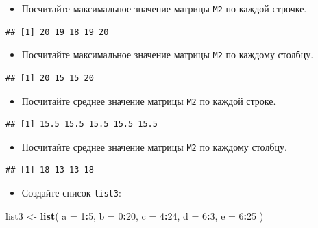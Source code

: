 \documentclass[]{book}
\newenvironment{Shaded}{\begin{snugshade}}{\end{snugshade}}
\newcommand{\KeywordTok}[1]{\textcolor[rgb]{0.13,0.29,0.53}{\textbf{#1}}}
\newcommand{\DataTypeTok}[1]{\textcolor[rgb]{0.13,0.29,0.53}{#1}}
\newcommand{\DecValTok}[1]{\textcolor[rgb]{0.00,0.00,0.81}{#1}}
\newcommand{\StringTok}[1]{\textcolor[rgb]{0.31,0.60,0.02}{#1}}
\newcommand{\OperatorTok}[1]{\textcolor[rgb]{0.81,0.36,0.00}{\textbf{#1}}}
\newcommand{\NormalTok}[1]{#1}
\providecommand{\tightlist}{%
  \setlength{\itemsep}{0pt}\setlength{\parskip}{0pt}}
\begin{document}
\begin{itemize}
\tightlist
\item
  Посчитайте максимальное значение матрицы \texttt{M2} по каждой
  строчке.
\end{itemize}

\begin{verbatim}
## [1] 20 19 18 19 20
\end{verbatim}

\begin{itemize}
\tightlist
\item
  Посчитайте максимальное значение матрицы \texttt{M2} по каждому
  столбцу.
\end{itemize}

\begin{verbatim}
## [1] 20 15 15 20
\end{verbatim}

\begin{itemize}
\tightlist
\item
  Посчитайте среднее значение матрицы \texttt{M2} по каждой строке.
\end{itemize}

\begin{verbatim}
## [1] 15.5 15.5 15.5 15.5 15.5
\end{verbatim}

\begin{itemize}
\tightlist
\item
  Посчитайте среднее значение матрицы \texttt{M2} по каждому столбцу.
\end{itemize}

\begin{verbatim}
## [1] 18 13 13 18
\end{verbatim}

\begin{itemize}
\tightlist
\item
  Создайте список \texttt{list3}:
\end{itemize}

\begin{Shaded}
\begin{Highlighting}[]
\NormalTok{list3 <-}\StringTok{ }\KeywordTok{list}\NormalTok{(}
  \DataTypeTok{a =} \DecValTok{1}\OperatorTok{:}\DecValTok{5}\NormalTok{,}
  \DataTypeTok{b =} \DecValTok{0}\OperatorTok{:}\DecValTok{20}\NormalTok{,}
  \DataTypeTok{c =} \DecValTok{4}\OperatorTok{:}\DecValTok{24}\NormalTok{,}
  \DataTypeTok{d =} \DecValTok{6}\OperatorTok{:}\DecValTok{3}\NormalTok{,}
  \DataTypeTok{e =} \DecValTok{6}\OperatorTok{:}\DecValTok{25}
\NormalTok{  )}
\end{Highlighting}
\end{Shaded}
\end{document}
